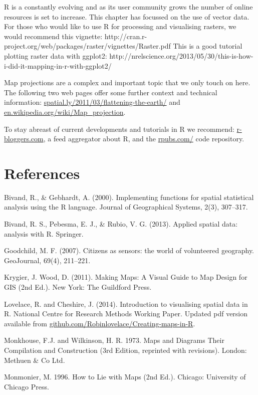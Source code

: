 \documentclass[]{article}
\begin{document}
R is a constantly evolving and as its user community grows the number of online resources is set to increase. 
This chapter has focussed on the use of vector data. For those who would like to use R for processing and visualising rasters, we would recommend this vignette: http://cran.r-project.org/web/packages/raster/vignettes/Raster.pdf
This is a good tutorial plotting raster data with ggplot2: http://nrelscience.org/2013/05/30/this-is-how-i-did-it-mapping-in-r-with-ggplot2/

Map projections are a complex and important topic that we only touch on here. The following two web pages offer some further context and technical information:
\href{http://spatial.ly/2011/03/flattening-the-earth/}{spatial.ly/2011/03/flattening-the-earth/}
and \href{http://en.wikipedia.org/wiki/Map_projection}{en.wikipedia.org/wiki/Map\_projection}.


To stay abreast of current developments and tutorials in R we recommend:
\href{http://www.r-bloggers.com/}{r-bloggers.com}, a feed aggregator about R, and 
the \href{https://rpubs.com/}{rpubs.com/}
code repository.

\section{References}

Bivand, R., \& Gebhardt, A. (2000). Implementing functions for spatial
statistical analysis using the R language. Journal of Geographical
Systems, 2(3), 307--317.

Bivand, R. S., Pebesma, E. J., \& Rubio, V. G. (2013). Applied spatial
data: analysis with R. Springer.

Goodchild, M. F. (2007). Citizens as sensors: the world of volunteered
geography. GeoJournal, 69(4), 211--221.

Krygier, J. Wood, D. (2011). Making Maps: A Visual Guide to Map Design
for GIS (2nd Ed.). New York: The Guildford Press.

Lovelace, R. and Cheshire, J. (2014). Introduction to visualising
spatial data in R. National Centre for Research Methods Working Paper.
Updated pdf version available from
\href{https://github.com/Robinlovelace/Creating-maps-in-R}{github.com/Robinlovelace/Creating-maps-in-R}.

Monkhouse, F.J. and Wilkinson, H. R. 1973. Maps and Diagrams Their
Compilation and Construction (3rd Edition, reprinted with revisions).
London: Methuen \& Co Ltd.

Monmonier, M. 1996. How to Lie with Maps (2nd Ed.). Chicago: University
of Chicago Press.
\end{document}

